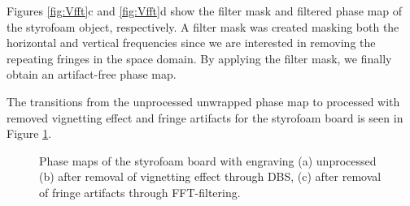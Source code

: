 Figures \ref{fig:Vfft}c and \ref{fig:Vfft}d show the filter mask and filtered phase map of the styrofoam object, respectively. A filter mask was created masking both the horizontal and vertical frequencies since we are interested in removing the repeating fringes in the space domain. By applying the filter mask, we finally obtain an artifact-free phase map.

The transitions from the unprocessed unwrapped phase map to processed with removed vignetting effect and fringe artifacts for the styrofoam board is seen in Figure \ref{fig:Vprocessed}.

\begin{figure}[h!]
	\centering
	\caption[Unprocessed and processed phase maps of styrofoam board with engraving]{Phase maps of the styrofoam board with engraving (a) unprocessed (b) after removal of vignetting effect through DBS, (c) after removal of fringe artifacts through FFT-filtering.}
	\label{fig:Vprocessed}
\end{figure}

